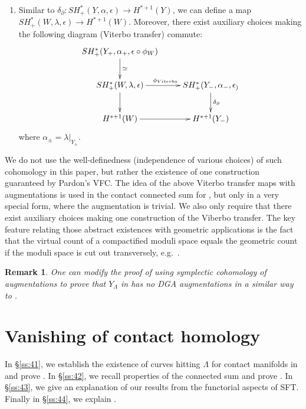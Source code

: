 \documentclass[reqno,11pt]{amsart}
\numberwithin{equation}{section}
\newtheorem{remark}[theorem]{\textbf{Remark}}
\DeclareMathOperator{\CC}{CC}
\begin{document}
\begin{enumerate}
    We consider a Hamiltonian $H_{VT}$ on $\widehat{X}$ that is similar to the Hamiltonian in the construction of the Viterbo transfer map; following the same recipe as the Viterbo transfer map, along with the correction from the augmentation $\epsilon$, we get a Viterbo transfer map
    $$SH_+^{*}(X,\lambda,\epsilon)\to SH_+^*(Y_-,\lambda|_{Y_-},\epsilon).$$
    By neck-stretching along $Y_+ \subset \widehat{X}$, we get an isomorphism 
    $$SH_+^*(X,\lambda,\epsilon)\simeq SH_+^*(Y_+,\lambda|_{Y_+},\epsilon\circ \phi_X),$$
    where $\phi_X$ is the DGA morphism from the cobordism $X$; hence $\epsilon\circ \phi_X$ is a DGA augmentation of $\CC(Y_+,\lambda|_{Y_+})$. 
    \item Similar to $\delta_{\partial}:SH^*_+(Y,\alpha,\epsilon)\to H^{*+1}(Y)$, we can define a map $SH^*_+(W,\lambda,\epsilon)\to H^{*+1}(W)$. Moreover, there exist auxiliary choices making the following diagram (Viterbo transfer) commute: $$
    \xymatrix{
    SH_{+}^*(Y_+,\alpha_+,\epsilon\circ\phi_{W})\ar[d]^{\simeq}  & \\
SH_{+}^*(W,\lambda,\epsilon)\ar[r]^{\phi_{Viterbo} }\ar[d] & SH_{+}^*(Y_-, \alpha_-, \epsilon_)\ar[d]^{\delta_{\partial}}\\
H^{*+1}(W) \ar[r] & H^{*+1}(Y_-)
}
$$
where $\alpha_{\pm}=\lambda|_{Y_{\pm}}$.
\end{enumerate}
We do not use the well-definedness (independence of various choices) of such cohomology in this paper, but rather the existence of one construction guaranteed by Pardon's VFC. The idea of the above Viterbo transfer maps with augmentations is used in the contact connected sum for , but only in a very special form, where the augmentation is trivial. We also only require that there exist auxiliary choices making one construction of the Viberbo transfer. The key feature relating those abstract existences with geometric applications is the fact that the virtual count of a compactified moduli space equals the geometric count if the moduli space is cut out transversely, e.g.\ \cite[Proposition 4.33]{zbMATH07085531}.

\begin{remark}
One can modify the proof of  using symplectic cohomology of augmentations to prove that $Y_{\Lambda}$ in  has no DGA augmentations in a similar way to . 
\end{remark}
\section{Vanishing of contact homology}
In \S \ref{ss:41}, we establish the existence of curves hitting $\Lambda$ for contact manifolds in  and prove . In \S \ref{ss:42}, we recall properties of the connected sum and prove . In \S \ref{ss:43}, we give an explanation of our results from the functorial aspects of SFT. Finally in \S \ref{ss:44}, we explain .
\end{document}
